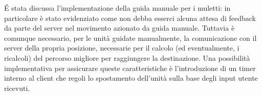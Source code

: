 \'E stata discussa l'implementazione della guida manuale per i muletti: in particolare è stato evidenziato come non debba esserci alcuna attesa di feedback da parte del server nel movimento azionato da guida manuale. Tuttavia è comunque necessario, per le unità guidate manualmente, la comunicazione con il server della propria posizione, necessarie per il calcolo (ed eventualmente, i ricalcoli) del percorso migliore per raggiungere la destinazione.
Una possibilità implementativa per assicurare queste caratteristiche è l'introduzione di un timer interno al client che regoli lo spostamento dell'unità sulla base degli input utente ricevuti.











